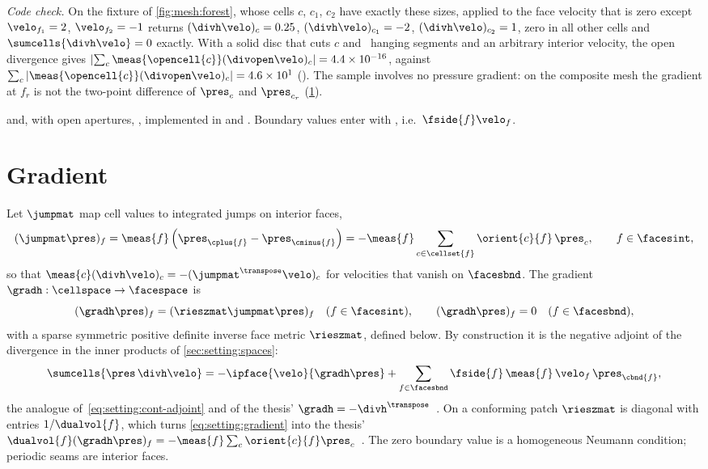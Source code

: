 \emph{Code check.} On the fixture of \cref{fig:mesh:forest}, whose cells $c$,
$c_1$, $c_2$ have exactly these sizes,  applied to the face
velocity that is zero except $\velo_{f_1}=2$, $\velo_{f_2}=-1$ returns
$(\divh\velo)_c=\chkDivC$, $(\divh\velo)_{c_1}=\chkDivCa$,
$(\divh\velo)_{c_2}=\chkDivCb$, zero in all other cells and
$\sumcells{\divh\velo}=0$ exactly. With a solid disc that cuts $c$ and
\chkOpenCutHanging\ hanging segments and an arbitrary interior velocity, the
open divergence gives
$\abs{\sum_c\meas{\opencell{c}}(\divopen\velo)_c}=\chkOpenDivSum$, against
$\sum_c\abs{\meas{\opencell{c}}(\divopen\velo)_c}=\chkOpenDivScale$
(). The sample involves no pressure gradient: on the
composite mesh the gradient at $f_r$ is not the two-point difference of
$\pres_c$ and $\pres_{c_r}$ (\cref{sec:setting:gradient}).

\begin{implnote}
 and, with open apertures,
, implemented in
 and
. Boundary values enter with
, i.e.\ $\fside{f}\velo_f$.
\end{implnote}

\section{Gradient}\label{sec:setting:gradient}
Let $\jumpmat$ map cell values to integrated jumps on interior faces,
\begin{equation}\label{eq:setting:jump}
  (\jumpmat\pres)_f=\meas{f}\roundpar{\pres_{\cplus{f}}-\pres_{\cminus{f}}}
  =-\meas{f}\sum_{c\in\cellset{f}}\orient{c}{f}\,\pres_c,\qquad f\in\facesint,
\end{equation}
so that $\meas{c}(\divh\velo)_c=-(\jumpmat^{\transpose}\velo)_c$ for velocities
that vanish on $\facesbnd$. The gradient $\gradh:\cellspace\to\facespace$ is
\begin{equation}\label{eq:setting:gradient}
  (\gradh\pres)_f=(\rieszmat\jumpmat\pres)_f\quad (f\in\facesint),\qquad
  (\gradh\pres)_f=0\quad (f\in\facesbnd),
\end{equation}
with a sparse symmetric positive definite inverse face metric $\rieszmat$,
defined below. By construction it is the negative adjoint of the divergence
in the inner products of \cref{sec:setting:spaces}:
\begin{equation}\label{eq:setting:adjoint}
  \sumcells{\pres\,\divh\velo}=-\ipface{\velo}{\gradh\pres}
  +\sum_{f\in\facesbnd}\fside{f}\,\meas{f}\,\velo_f\,\pres_{\cbnd{f}},
\end{equation}
the analogue of~\cref{eq:setting:cont-adjoint} and of the thesis'
$\gradh=-\divh^{\transpose}$~. On a conforming patch
$\rieszmat$ is diagonal with entries $1/\dualvol{f}$, which turns
\cref{eq:setting:gradient} into the thesis'
$\dualvol{f}(\gradh\pres)_f=-\meas{f}\sum_c\orient{c}{f}\pres_c$~.
The zero boundary value is a homogeneous Neumann condition; periodic seams are
interior faces.

